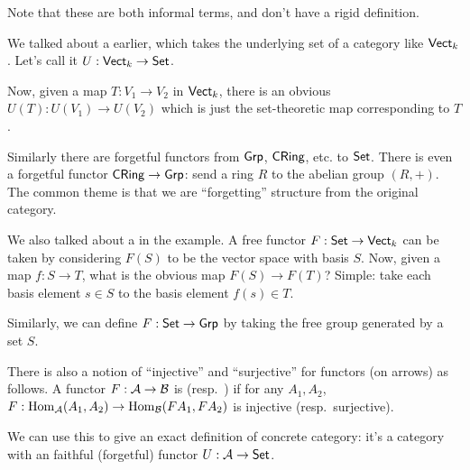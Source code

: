 \begin{example}
	Note that these are both informal terms,
	and don't have a rigid definition.
	\begin{enumerate}[(a)]
		\ii We talked about a  earlier,
		which takes the underlying set of a category like $\mathsf{Vect}_k$.
		Let's call it $U : \mathsf{Vect}_k \to \mathsf{Set}$.

		Now, given a map $T : V_1 \to V_2$ in $\mathsf{Vect}_k$,
		there is an obvious $U(T) : U(V_1) \to U(V_2)$ which is just
		the set-theoretic map corresponding to $T$.

		Similarly there are forgetful functors from $\mathsf{Grp}$, $\mathsf{CRing}$,
		etc. to $\mathsf{Set}$.
		There is even a forgetful functor $\mathsf{CRing} \to \mathsf{Grp}$:
		send a ring $R$ to the abelian group $(R,+)$.
		The common theme is that we are ``forgetting'' structure
		from the original category.

		\ii We also talked about a  in the example.
		A free functor $F : \mathsf{Set} \to \mathsf{Vect}_k$ can be taken by considering
		$F(S)$ to be the vector space with basis $S$.
		Now, given a map $f : S \to T$, what is the obvious map $F(S) \to F(T)$?
		Simple: take each basis element $s \in S$ to the basis element $f(s) \in T$.

		Similarly, we can define $F : \mathsf{Set} \to \mathsf{Grp}$
		by taking the free group generated by a set $S$.
	\end{enumerate}
\end{example}
\begin{remark}
	There is also a notion of ``injective'' and ``surjective'' for functors (on arrows) as follows.
	A functor $F : \mathcal A \to \mathcal B$ is  (resp.\ ) if for any $A_1, A_2$,
	$F : \operatorname{Hom}_\mathcal A(A_1, A_2) \to \operatorname{Hom}_\mathcal B(FA_1, FA_2)$ is injective (resp.\ surjective).

	We can use this to give an exact definition of concrete category:
	it's a category with an faithful (forgetful) functor $U: \mathcal A \to \mathsf{Set}$.
\end{remark}

